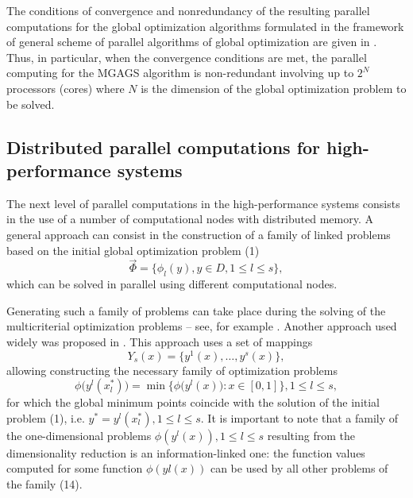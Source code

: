 \documentclass[
11pt,%
tightenlines,%
twoside,%
onecolumn,%
nofloats,%
nobibnotes,%
nofootinbib,%
superscriptaddress,%
noshowpacs,%
centertags]%
{revtex4}
\begin{document}
The conditions of convergence and nonredundancy of the resulting parallel computations for the global optimization algorithms formulated in the framework of general scheme of parallel algorithms of global optimization are given in \cite{Strongin1, Strongin2, Strongin4, Grishagin2}. Thus, in particular, when the convergence conditions are met, the parallel computing for the MGAGS algorithm is non-redundant involving up to $2^N$ processors (cores) where $N$ is the dimension of the global optimization problem to be solved.

\subsection{Distributed parallel computations for high-performance systems}

The next level of parallel computations in the high-performance systems consists in the use of a number of computational nodes with distributed memory. A general approach can consist in the construction of a family of linked problems based on the initial global optimization problem (1)
\begin{equation}
\overrightarrow{\Phi} = \{ \phi_l(y), y \in D, 1 \leq l \leq s \},
\end{equation}
which can be solved in parallel using different computational nodes.

Generating such a family of problems can take place during the solving of the multicriterial optimization problems -- see, for example \cite{Gergel3, Gergel4}. Another approach used widely was proposed in \cite{Strongin1, Strongin2, Strongin5, Gergel1}. This approach uses a set of mappings
\begin{equation}
Y_s(x) = \{ y^1(x), \dots , y^s(x) \},
\end{equation}
allowing constructing the necessary family of optimization problems 
\begin{equation}
\phi\bigl(y^l(x^\ast_l)\bigr) = \min \bigl\{\phi\bigl(y^l(x)\bigl): x \in [0, 1] \bigl\}, 1 \leq l \leq s,
\end{equation}
for which the global minimum points coincide with the solution of the initial problem (1), i.e. $ y^\ast = y^l(x_l^\ast), 1 \leq l \leq s$. It is important to note that a family of the one-dimensional problems $\phi(y^l(x)), 1 \leq l \leq s$ resulting from the dimensionality reduction is an information-linked one: the function values computed for some function $\phi(yl(x))$ can be used by all other problems of the family (14).
\end{document}
